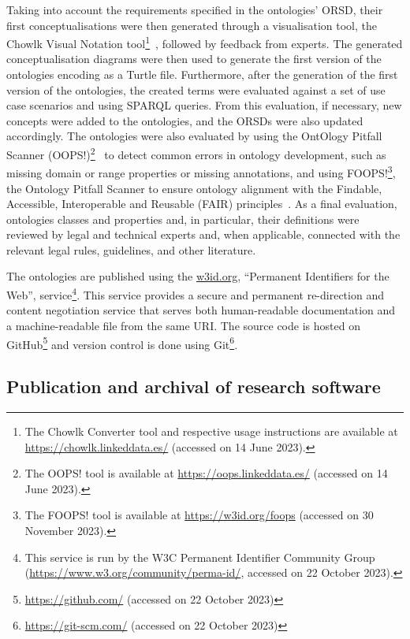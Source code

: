 Taking into account the requirements specified in the ontologies' ORSD, their first conceptualisations were then generated through a visualisation tool, the Chowlk Visual Notation tool\footnote{The Chowlk Converter tool and respective usage instructions are available at \url{https://chowlk.linkeddata.es/} (accessed on 14 June 2023).}~\citep{chavez-feria_chowlk_2022}, followed by feedback from experts. The generated conceptualisation diagrams were then used to generate the first version of the ontologies encoding as a Turtle file.
Furthermore, after the generation of the first version of the ontologies, the created terms were evaluated against a set of use case scenarios and using SPARQL queries.
From this evaluation, if necessary, new concepts were added to the ontologies, and the ORSDs were also updated accordingly.
The ontologies were also evaluated by using the OntOlogy Pitfall Scanner (OOPS!)\footnote{The OOPS! tool is available at \url{https://oops.linkeddata.es/} (accessed on 14 June 2023).}~\citep{poveda-villalon_oops_2014} to detect common errors in ontology development, such as missing domain or range properties or missing annotations, and using FOOPS!\footnote{The FOOPS! tool is available at \url{https://w3id.org/foops} (accessed on 30 November 2023).}, the Ontology Pitfall Scanner to ensure ontology alignment with the Findable, Accessible, Interoperable and Reusable (FAIR) principles~\citep{garijo_foops_2021}.
As a final evaluation, ontologies classes and properties and, in particular, their definitions were reviewed by legal and technical experts and, when applicable, connected with the relevant legal rules, guidelines, and other literature.

The ontologies are published using the \url{w3id.org}, ``Permanent Identifiers for the Web'', service\footnote{This service is run by the W3C Permanent Identifier Community Group (\url{https://www.w3.org/community/perma-id/}, accessed on 22 October 2023).}.
This service provides a secure and permanent re-direction and content negotiation service that serves both human-readable documentation and a machine-readable file from the same URI.
The source code is hosted on GitHub\footnote{\url{https://github.com/} (accessed on 22 October 2023)} and version control is done using Git\footnote{\url{https://git-scm.com/} (accessed on 22 October 2023)}.


\subsection{Publication and archival of research software}
\label{sec:code_preservation}

